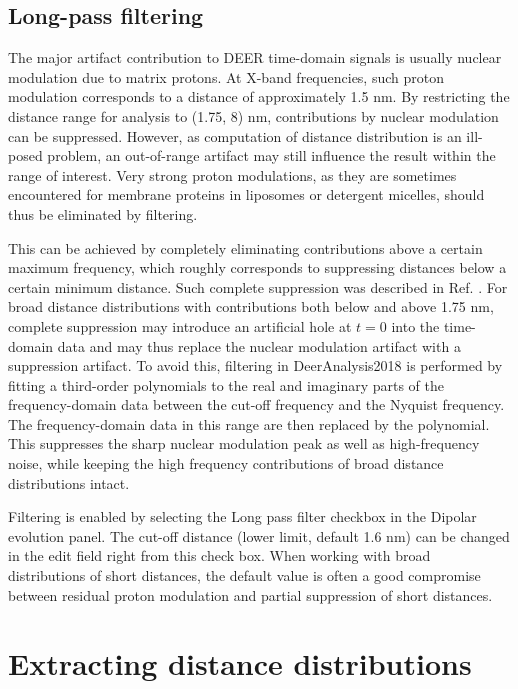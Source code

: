 \documentclass{article}
\begin{document}
\subsection{Long-pass filtering}
The major artifact contribution to DEER time-domain signals is usually nuclear
modulation due to matrix protons. At X-band frequencies, such proton modulation
corresponds to a distance of approximately 1.5 nm. By restricting the distance range for analysis to (1.75, 8) nm, contributions by nuclear modulation can be suppressed. However, as computation of distance distribution is an ill-posed problem, an out-of-range artifact may
still influence the result within the range of interest. Very strong proton modulations,
as they are sometimes encountered for membrane proteins in liposomes
or detergent micelles, should thus be eliminated by filtering.

This can be achieved by completely eliminating contributions above a certain
maximum frequency, which roughly corresponds to suppressing distances
below a certain minimum distance. Such complete suppression was described in
Ref. \cite{jeschke2004b}. For broad distance distributions with contributions both below and above 1.75 nm, complete suppression may introduce an artificial hole at $t = 0$ into the time-domain data and may thus replace the nuclear modulation artifact with a suppression
artifact. To avoid this, filtering in DeerAnalysis2018 is performed by fitting a third-order polynomials to the real and imaginary parts of the frequency-domain data between
the cut-off frequency and the Nyquist frequency. The frequency-domain data
in this range are then replaced by the polynomial. This suppresses the sharp
nuclear modulation peak as well as high-frequency noise, while keeping the high frequency
contributions of broad distance distributions intact.

Filtering is enabled by selecting the {\ttfamily Long pass filter} checkbox in the
{\ttfamily Dipolar evolution} panel. The cut-off distance (lower limit, default
1.6 nm) can be changed in the edit field right from this check box. When
working with broad distributions of short distances, the default value is often a
good compromise between residual proton modulation and partial suppression
of short distances.

\section{Extracting distance distributions}
\label{distribution}
\end{document}
